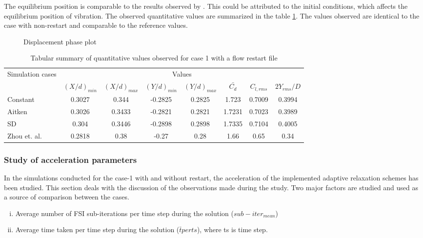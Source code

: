 The equilibrium position is comparable to the results observed by \citet{zhou1999vortex}. This could be attributed to the initial conditions, which affects the equilibrium position of vibration. The observed quantitative values are summarized in the table \ref{table:4.7}. The values observed are identical to the case with non-restart and comparable to the reference values.

\begin{figure}[H]
\centering
{}
\caption{Displacement phase plot}
\label{fig:4.12}
\end{figure}

\begin{table}[htbp]
  \centering
   \begin{tabular}{|l|c|c|c|c|c|c|c|}
    \hline
    \multicolumn{1}{|c|}{\multirow{2}[4]{*}{Simulation cases}} & \multicolumn{7}{c|}{Values} \\
\cline{2-8}          & $(X/d)_{min}$ & $(X/d)_{max}$ & $(Y/d)_{min}$ & $(Y/d)_{max}$ & $\bar{C_d}$  & $C_{l,rms}$ & $2Y_{rms}/D$ \\
    \hline
    Constant & 0.3027 & 0.344 & -0.2825 & 0.2825 & 1.723 & 0.7009 & 0.3994 \\
    \hline
    Aitken & 0.3026 & 0.3433 & -0.2821 & 0.2821 & 1.7231 & 0.7023 & 0.3989 \\
    \hline
    SD    & 0.304 & 0.3446 & -0.2898 & 0.2898 & 1.7335 & 0.7104 & 0.4005 \\
    \hline
    Zhou et. al. & 0.2818 & 0.38  & -0.27 & 0.28  & 1.66  & 0.65  & 0.34 \\
    \hline
    \end{tabular}%
    \caption{Tabular summary of quantitative values observed for case 1 with a flow restart file}
  \label{table:4.7}%
\end{table}%

\subsubsection{Study of acceleration parameters}

In the simulations conducted for the case-1 with and without restart, the acceleration of the implemented adaptive relaxation schemes has been studied. This section deals with the discussion of the observations made during the study. Two major factors are studied and used as a source of comparison between the cases.

\begin{enumerate}[(i)]
\item Average number of FSI sub-iterations per time step during the solution (${sub-iter}_{mean}$)
\item Average time taken per time step during the solution (${\bar{t}} per ts$), where ts is time step.
\end{enumerate}

